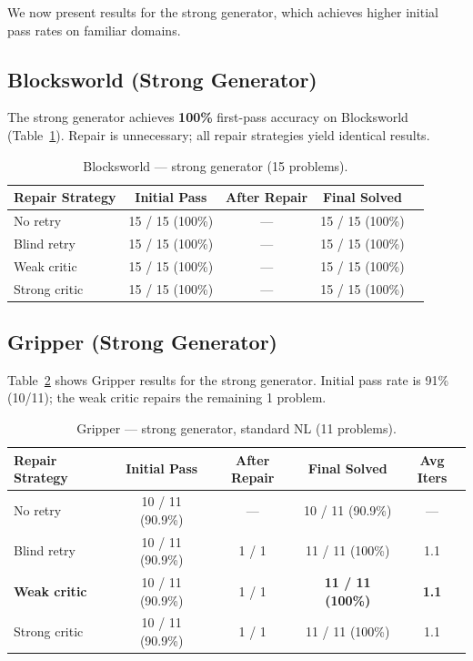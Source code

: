 \documentclass{article}
\begin{document}
We now present results for the strong generator, which achieves higher initial
pass rates on familiar domains.

\subsection{Blocksworld (Strong Generator)}
\label{sec:bw_strong}

The strong generator achieves \textbf{100\%} first-pass accuracy on Blocksworld
(Table~\ref{tab:bw_strong}).  Repair is unnecessary; all repair strategies yield
identical results.

\begin{table}[h]
\centering
\caption{Blocksworld --- strong generator (15 problems).}
\label{tab:bw_strong}
\begin{tabular}{lcccc}
\toprule
\textbf{Repair Strategy} & \textbf{Initial Pass} & \textbf{After Repair} & \textbf{Final Solved} \\
\midrule
No retry     & 15 / 15 (100\%) & ---  & 15 / 15 (100\%) \\
Blind retry  & 15 / 15 (100\%) & ---  & 15 / 15 (100\%) \\
Weak critic  & 15 / 15 (100\%) & ---  & 15 / 15 (100\%) \\
Strong critic & 15 / 15 (100\%) & ---  & 15 / 15 (100\%) \\
\bottomrule
\end{tabular}
\end{table}

\subsection{Gripper (Strong Generator)}
\label{sec:gr_strong}

Table~\ref{tab:gr_strong} shows Gripper results for the strong generator.  Initial
pass rate is 91\% (10/11); the weak critic repairs the remaining 1 problem.

\begin{table}[h]
\centering
\caption{Gripper --- strong generator, standard NL (11 problems).}
\label{tab:gr_strong}
\begin{tabular}{lcccc}
\toprule
\textbf{Repair Strategy} & \textbf{Initial Pass} & \textbf{After Repair} & \textbf{Final Solved} & \textbf{Avg Iters} \\
\midrule
No retry      & 10 / 11 (90.9\%) & ---  & 10 / 11 (90.9\%) & --- \\
Blind retry   & 10 / 11 (90.9\%) & 1 / 1 & 11 / 11 (100\%) & 1.1 \\
\textbf{Weak critic}  & 10 / 11 (90.9\%) & 1 / 1 & \textbf{11 / 11 (100\%)} & \textbf{1.1} \\
Strong critic & 10 / 11 (90.9\%) & 1 / 1 & 11 / 11 (100\%) & 1.1 \\
\bottomrule
\end{tabular}
\end{table}
\end{document}
